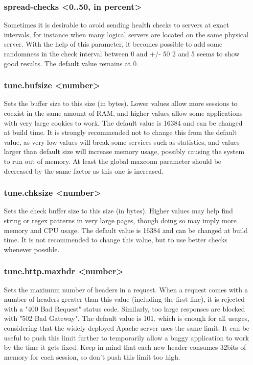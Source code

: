 \subsubsection[spread-checks]{spread-checks <0..50, in percent>}
  Sometimes it is desirable to avoid sending health checks to servers at exact
  intervals, for instance when many logical servers are located on the same
  physical server. With the help of this parameter, it becomes possible to add
  some randomness in the check interval between 0 and +/- 50%
  2 and 5 seems to show good results. The default value remains at 0.

\subsubsection[tune.bufsize]{tune.bufsize <number>}
  Sets the buffer size to this size (in bytes). Lower values allow more
  sessions to coexist in the same amount of RAM, and higher values allow some
  applications with very large cookies to work. The default value is 16384 and
  can be changed at build time. It is strongly recommended not to change this
  from the default value, as very low values will break some services such as
  statistics, and values larger than default size will increase memory usage,
  possibly causing the system to run out of memory. At least the global maxconn
  parameter should be decreased by the same factor as this one is increased.

\subsubsection[tune.chksize]{tune.chksize <number>}
  Sets the check buffer size to this size (in bytes). Higher values may help
  find string or regex patterns in very large pages, though doing so may imply
  more memory and CPU usage. The default value is 16384 and can be changed at
  build time. It is not recommended to change this value, but to use better
  checks whenever possible.

\subsubsection[tune.http.maxhdr]{tune.http.maxhdr <number>}
  Sets the maximum number of headers in a request. When a request comes with a
  number of headers greater than this value (including the first line), it is
  rejected with a "400 Bad Request" status code. Similarly, too large responses
  are blocked with "502 Bad Gateway". The default value is 101, which is enough
  for all usages, considering that the widely deployed Apache server uses the
  same limit. It can be useful to push this limit further to temporarily allow
  a buggy application to work by the time it gets fixed. Keep in mind that each
  new header consumes 32bits of memory for each session, so don't push this
  limit too high.

